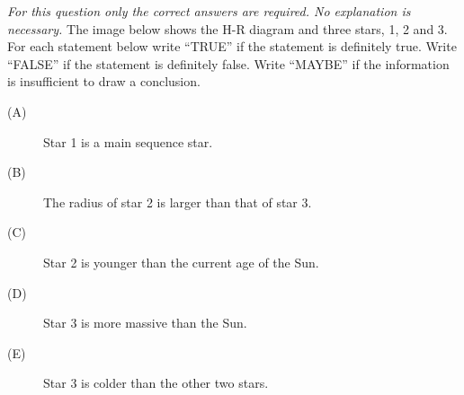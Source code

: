 \textit{For this question only the correct answers are required. No explanation is necessary.}
The image below shows the H-R diagram and three stars, 1, 2 and 3. For each statement below write
``TRUE'' if the statement is definitely true. Write ``FALSE'' if the statement is definitely false.
Write ``MAYBE'' if the information is insufficient to draw a conclusion.
\begin{description}
\item[(A)] Star 1 is a main sequence star.
\item[(B)] The radius of star 2 is larger than that of star 3.
\item[(C)] Star 2 is younger than the current age of the Sun.
\item[(D)] Star 3 is more massive than the Sun.
\item[(E)] Star 3 is colder than the other two stars.
\end{description}
